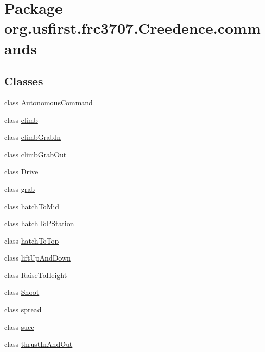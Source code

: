 \hypertarget{namespaceorg_1_1usfirst_1_1frc3707_1_1_creedence_1_1commands}{}\section{Package org.\+usfirst.\+frc3707.\+Creedence.\+commands}
\label{namespaceorg_1_1usfirst_1_1frc3707_1_1_creedence_1_1commands}
\subsection*{Classes}
\begin{DoxyCompactItemize}
\item 
class \mbox{\hyperlink{classorg_1_1usfirst_1_1frc3707_1_1_creedence_1_1commands_1_1_autonomous_command}{Autonomous\+Command}}
\item 
class \mbox{\hyperlink{classorg_1_1usfirst_1_1frc3707_1_1_creedence_1_1commands_1_1climb}{climb}}
\item 
class \mbox{\hyperlink{classorg_1_1usfirst_1_1frc3707_1_1_creedence_1_1commands_1_1climb_grab_in}{climb\+Grab\+In}}
\item 
class \mbox{\hyperlink{classorg_1_1usfirst_1_1frc3707_1_1_creedence_1_1commands_1_1climb_grab_out}{climb\+Grab\+Out}}
\item 
class \mbox{\hyperlink{classorg_1_1usfirst_1_1frc3707_1_1_creedence_1_1commands_1_1_drive}{Drive}}
\item 
class \mbox{\hyperlink{classorg_1_1usfirst_1_1frc3707_1_1_creedence_1_1commands_1_1grab}{grab}}
\item 
class \mbox{\hyperlink{classorg_1_1usfirst_1_1frc3707_1_1_creedence_1_1commands_1_1hatch_to_mid}{hatch\+To\+Mid}}
\item 
class \mbox{\hyperlink{classorg_1_1usfirst_1_1frc3707_1_1_creedence_1_1commands_1_1hatch_to_p_station}{hatch\+To\+P\+Station}}
\item 
class \mbox{\hyperlink{classorg_1_1usfirst_1_1frc3707_1_1_creedence_1_1commands_1_1hatch_to_top}{hatch\+To\+Top}}
\item 
class \mbox{\hyperlink{classorg_1_1usfirst_1_1frc3707_1_1_creedence_1_1commands_1_1lift_up_and_down}{lift\+Up\+And\+Down}}
\item 
class \mbox{\hyperlink{classorg_1_1usfirst_1_1frc3707_1_1_creedence_1_1commands_1_1_raise_to_height}{Raise\+To\+Height}}
\item 
class \mbox{\hyperlink{classorg_1_1usfirst_1_1frc3707_1_1_creedence_1_1commands_1_1_shoot}{Shoot}}
\item 
class \mbox{\hyperlink{classorg_1_1usfirst_1_1frc3707_1_1_creedence_1_1commands_1_1spread}{spread}}
\item 
class \mbox{\hyperlink{classorg_1_1usfirst_1_1frc3707_1_1_creedence_1_1commands_1_1succ}{succ}}
\item 
class \mbox{\hyperlink{classorg_1_1usfirst_1_1frc3707_1_1_creedence_1_1commands_1_1thrust_in_and_out}{thrust\+In\+And\+Out}}
\end{DoxyCompactItemize}
